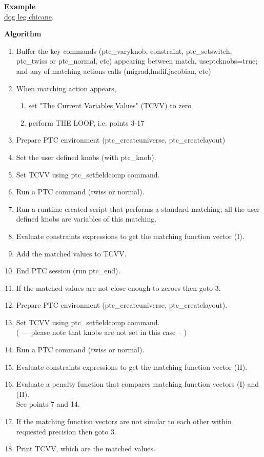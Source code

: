 {\bf Example}\\
\href{http://cern.ch/frs/mad-X_examples/ptc_madx_interface/matchknobs/.madx}{dog leg chicane}.


{\bf Algorithm}\\
\begin{enumerate}
   \item Buffer the key commands (ptc\_varyknob, constraint,
     ptc\_setswitch, ptc\_twiss or ptc\_normal, etc) appearing between 
     match, useptcknobs=true; and any of matching actions calls
     (migrad,lmdif,jacobian, etc) 
   \item  When matching action appears,  
     \begin{enumerate}
       \item set "The Current Variables Values" (TCVV) to zero      
       \item perform THE LOOP, i.e. points 3-17 
     \end{enumerate}
   \item Prepare PTC environment (ptc\_createuniverse,
     ptc\_createlayout)  
   \item Set the user defined knobs (with ptc\_knob).  
   \item Set TCVV using ptc\_setfieldcomp command.  
   \item Run a PTC command (twiss or normal).  
   \item Run a runtime created script that performs a standard matching;
     all the user defined knobs are variables of this matching.  
   \item Evaluate constraints expressions to get the matching function
     vector (I). 
   \item Add the matched values to TCVV. 
   \item End PTC session (run ptc\_end). 
   \item If the matched values are not close enough to zeroes then goto 3.
   \item Prepare PTC environment (ptc\_createuniverse,
     ptc\_createlayout). 
   \item Set TCVV using ptc\_setfieldcomp command.
     \\   ( --- please note that knobs are not set in this case  -- )  
   \item Run a PTC command (twiss or normal).
   \item Evaluate constraints expressions to get the matching function
     vector (II). 
   \item Evaluate a penalty function that compares matching function
     vectors (I) and (II).\\     See points 7 and 14.
   \item If the matching function vectors are not similar to each other
     within requested precision then goto 3. 
   \item Print TCVV, which are the matched values. 
\end{enumerate}


